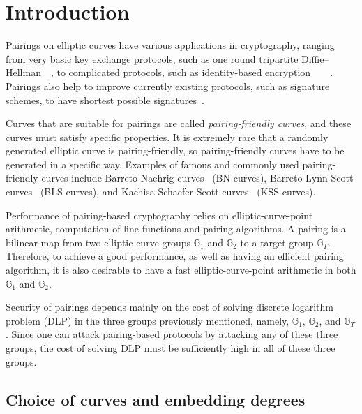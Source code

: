 \section{Introduction}
\label{sec:intro}

Pairings on elliptic curves have various applications in cryptography,
ranging from very basic key exchange protocols,
such as one round tripartite Diffie--Hellman~\cite{2000/joux-ants}~\cite{2004/joux-tripartite},
to complicated protocols, such as
identity-based encryption~\cite{2001/boneh}~\cite{2002/horwitz}~\cite{2002/gentry}~\cite{2005/sahai}.
Pairings also help to improve currently existing protocols, 
such as signature schemes, to have shortest possible signatures~\cite{2004/boneh}.

Curves that are suitable for pairings are called {\emph{pairing-friendly curves}},
and these curves must satisfy specific properties.
It is extremely rare that a randomly generated elliptic curve is pairing-friendly,
so pairing-friendly curves have to be generated in a specific way.
Examples of famous and commonly used pairing-friendly curves include 
Barreto-Naehrig curves~\cite{2006/barreto} (BN curves),
Barreto-Lynn-Scott curves~\cite{2003/bls} (BLS curves), and
Kachisa-Schaefer-Scott curves~\cite{2008/kss} (KSS curves).

Performance of pairing-based cryptography relies on
elliptic-curve-point arithmetic, computation of line functions and pairing algorithms.
A pairing is a bilinear map from two elliptic curve groups $\mathbb{G}_1$ and $\mathbb{G}_2$ to
a target group $\mathbb{G}_T$.
Therefore, to achieve a good performance, as well as having an efficient pairing algorithm,
it is also desirable to have a fast elliptic-curve-point arithmetic in both $\mathbb{G}_1$ and $\mathbb{G}_2$.

Security of pairings depends mainly on the cost of solving discrete logarithm problem (DLP) in the three groups previously mentioned,
namely, $\mathbb{G}_1$, $\mathbb{G}_2$, and $\mathbb{G}_T$.
Since one can attack pairing-based protocols by attacking any of these three groups,
the cost of solving DLP must be sufficiently high in all of these three groups.


\subsection{Choice of curves and embedding degrees}

